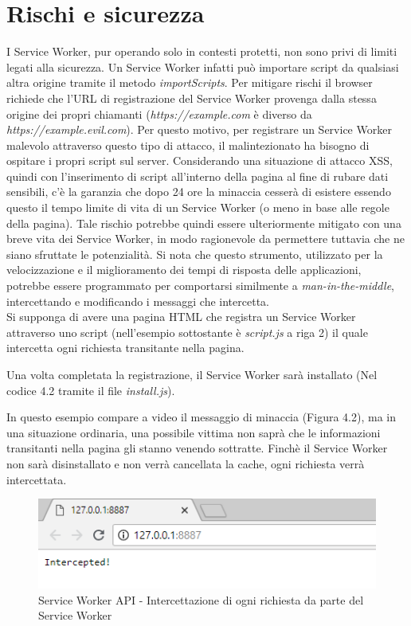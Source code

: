 \documentclass[12pt ,a4paper , twoside , openright ]{book}
\begin{document}
	\section{Rischi e sicurezza}
	I Service Worker, pur operando solo in contesti protetti, non sono privi di limiti legati alla sicurezza\cite{rif29,rif27}. Un Service Worker infatti può importare script da qualsiasi altra origine tramite il metodo \textit{importScripts}. Per mitigare rischi il browser richiede che l'URL di registrazione del Service Worker provenga dalla stessa origine dei propri chiamanti (\textit{https://example.com} è diverso da \textit{https://example.evil.com}). Per questo motivo, per registrare un Service Worker malevolo attraverso questo tipo di attacco, il malintezionato ha bisogno di ospitare i propri script sul server. Considerando una situazione di attacco XSS, quindi con l'inserimento di script all'interno della pagina al fine di rubare dati sensibili, c'è la garanzia che dopo 24 ore la minaccia cesserà di esistere essendo questo il tempo limite di vita di un Service Worker (o meno in base alle regole della pagina). Tale rischio potrebbe quindi essere ulteriormente mitigato con una breve vita dei Service Worker, in modo ragionevole da permettere tuttavia che ne siano sfruttate le potenzialità. Si nota che questo strumento, utilizzato per la velocizzazione e il miglioramento dei tempi di risposta delle applicazioni, potrebbe essere programmato per comportarsi similmente a \textit{man-in-the-middle}, intercettando e modificando i messaggi che intercetta. \\
	Si supponga di avere una pagina HTML che registra un Service Worker attraverso uno script (nell'esempio sottostante è \textit{script.js} a riga 2) il quale intercetta ogni richiesta transitante nella pagina. 
	
	Una volta completata la registrazione, il Service Worker sarà installato (Nel codice 4.2 tramite il file \textit{install.js}).
	
	In questo esempio compare a video il messaggio di minaccia (Figura 4.2), ma in una situazione ordinaria, una possibile vittima non saprà che le informazioni transitanti nella pagina gli stanno venendo sottratte. 
	Finchè il Service Worker non sarà disinstallato e non verrà cancellata la cache, ogni richiesta verrà intercettata.
	\begin{figure}[h]
		\centering
		\includegraphics[width=0.7\linewidth]{Intercepted}
		\caption{Service Worker API - Intercettazione di ogni richiesta da parte del Service Worker}
		\label{fig: Service Worker API - Intercettazione di ogni richiesta da parte del Service Worker}
	\end{figure}
\end{document}
